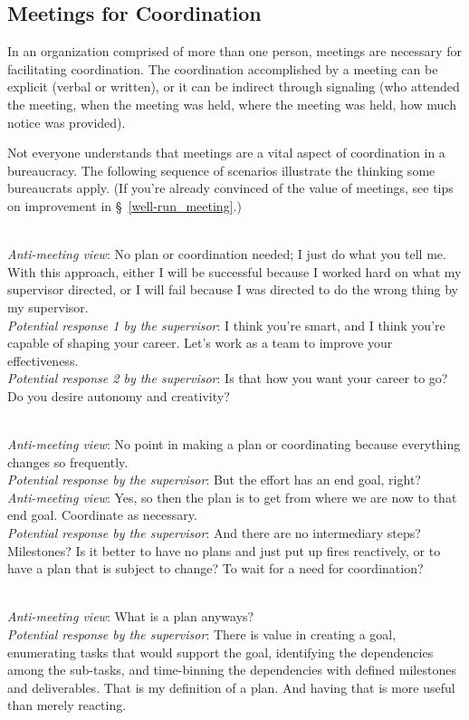 \subsection{Meetings for Coordination\label{sec:meetings-for-coordination}}
In an organization comprised of more than one person, meetings are necessary for facilitating coordination. The coordination accomplished by a meeting can be explicit (verbal or written), or it can be indirect through signaling (who attended the meeting, when the meeting was held, where the meeting was held, how much notice was provided). 

Not everyone understands that meetings are a vital aspect of coordination in a bureaucracy. The following sequence of scenarios illustrate the thinking some bureaucrats apply. (If you're already convinced of the value of meetings, see tips on improvement in \S~\ref{well-run_meeting}.)


\ \\
\textit{Anti-meeting view}: No plan or coordination needed; I just do what you tell me. With this approach, either I will be successful because I worked hard on what my supervisor directed, or I will fail because I was directed to do the wrong thing by my supervisor.\\
\textit{Potential response 1 by the supervisor}: I think you're smart, and I think you're capable of shaping your career. Let's work as a team to improve your effectiveness. \\
\textit{Potential response 2 by the supervisor}: Is that how you want your career to go? Do you desire autonomy and creativity?

\ \\
\textit{Anti-meeting view}: No point in making a plan or coordinating because everything changes so frequently. \\
\textit{Potential response by the supervisor}: But the effort has an end goal, right?\\
\textit{Anti-meeting view}:  Yes, so then the plan is to get from where we are now to that end goal. Coordinate as necessary. \\
\textit{Potential response by the supervisor}: And there are no intermediary steps? Milestones?
Is it better to have no plans and just put up fires reactively, or to have a plan that is subject to change? To wait for a need for coordination?

\ \\
\textit{Anti-meeting view}: What is a plan anyways?\\
\textit{Potential response by the supervisor}: There is value in creating a goal, enumerating tasks that would support the goal, identifying the dependencies among the sub-tasks, and time-binning the dependencies with defined milestones and deliverables. That is my definition of a plan. And having that is more useful than merely reacting.

